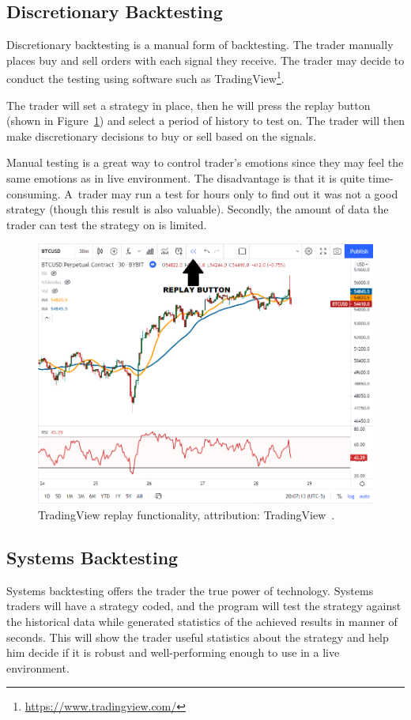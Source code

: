 \subsection*{Discretionary Backtesting}
Discretionary backtesting is a manual form of backtesting. The trader manually places buy and sell orders with each signal they receive. The trader may decide to conduct the testing using software such as TradingView\footnote{\url{https://www.tradingview.com/}}.

The trader will set a strategy in place, then he will press the replay button (shown in Figure~\ref{tradingview-figure}) and select a period of history to test on. The trader will then make discretionary decisions to buy or sell based on the signals.

Manual testing is a great way to control trader's emotions since they may feel the same emotions as in live environment. The disadvantage is that it is quite time-consuming. A~trader may run a test for hours only to find out it was not a good strategy (though this result is also valuable). Secondly, the amount of data the trader can test the strategy on is limited.

\begin{figure}[!t]
    \centering
    \includegraphics[width=\columnwidth]{figures/tradingview-replay.png}
    \caption{TradingView replay functionality, attribution: TradingView~\cite{backtesting-crypto-trading-strategies}.}
    \label{tradingview-figure}
\end{figure}

\subsection*{Systems Backtesting}
Systems backtesting offers the trader the true power of technology. Systems traders will have a strategy coded, and the program will test the strategy against the historical data while generated statistics of the achieved results in manner of seconds. This will show the trader useful statistics about the strategy and help him decide if it is robust and well-performing enough to use in a live environment.

